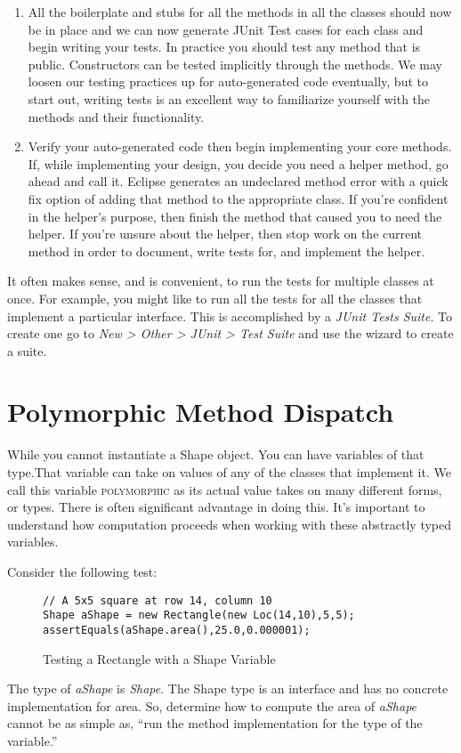 \documentclass[]{tufte-handout}
\begin{document}
\begin{enumerate}
\item All the boilerplate and stubs for all the methods in all the classes should now be in place and we can now generate JUnit Test cases for each class and begin writing your tests. \newline
In practice you should test any method that is public. Constructors can be tested implicitly through the methods. We may loosen our testing practices up for auto-generated code eventually, but to start out, writing tests is an excellent way to familiarize yourself with the methods and their functionality. 

\item Verify your auto-generated code then begin implementing your core methods. \newline
If, while implementing your design, you decide you need a helper method, go ahead and call it. Eclipse generates an undeclared method error with a quick fix option of adding that method to the appropriate class. If you're confident in the helper's purpose, then finish the method that caused you to need the helper. If you're unsure about the helper, then stop work on the current method in order to document, write tests for, and implement the helper.
\end{enumerate}

It often makes sense, and is convenient, to run the tests for multiple classes at once. For example, you might like to run all the tests for all the classes that implement a particular interface. This is accomplished by a \textit{JUnit Tests Suite}. To create one go to \textit{New > Other > JUnit > Test Suite} and use the wizard to create a suite. 

\section{Polymorphic Method Dispatch}

While you cannot instantiate a Shape object. You can have variables of that type.That variable can take on values of any of the classes that implement it. We call this variable \textsc{polymorphic} as its actual value takes on many different forms, or types. There is often significant advantage in doing this. It's important to understand how computation proceeds when working with these abstractly typed variables. 

Consider the following test:
\begin{figure}
\begin{lstlisting}
// A 5x5 square at row 14, column 10
Shape aShape = new Rectangle(new Loc(14,10),5,5);
assertEquals(aShape.area(),25.0,0.000001);
\end{lstlisting}
\caption{Testing a Rectangle with a Shape Variable}
\end{figure}
The type of \textit{aShape} is \textit{Shape}. The Shape type is an interface and has no concrete implementation for area. So, determine how to compute the area of \textit{aShape} cannot be as simple as, ``run the method implementation for the type of the variable.''  
\end{document}
